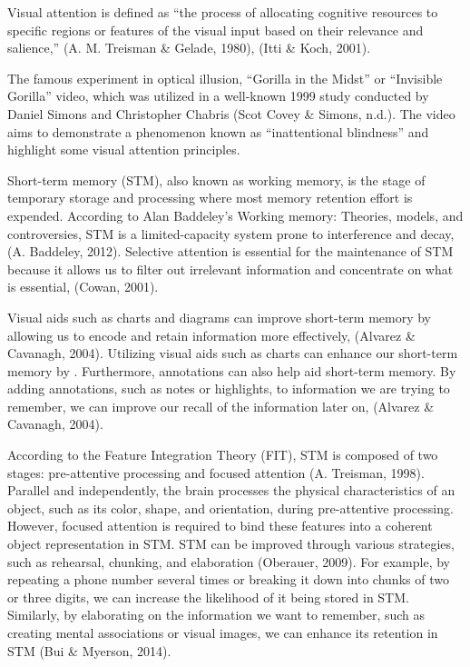 \documentclass[print]{nuthesis}
\begin{document}
Visual attention is defined as ``the process of allocating cognitive resources to specific regions or features of the visual input based on their relevance and salience,'' (A. M. Treisman \& Gelade, 1980), (Itti \& Koch, 2001).

The famous experiment in optical illusion, ``Gorilla in the Midst'' or ``Invisible Gorilla'' video, which was utilized in a well-known 1999 study conducted by Daniel Simons and Christopher Chabris (Scot Covey \& Simons, n.d.). The video aims to demonstrate a phenomenon known as ``inattentional blindness'' and highlight some visual attention principles.

Short-term memory (STM), also known as working memory, is the stage of temporary storage and processing where most memory retention effort is expended.
According to Alan Baddeley's Working memory: Theories, models, and controversies, STM is a limited-capacity system prone to interference and decay, (A. Baddeley, 2012).
Selective attention is essential for the maintenance of STM because it allows us to filter out irrelevant information and concentrate on what is essential, (Cowan, 2001).

Visual aids such as charts and diagrams can improve short-term memory by allowing us to encode and retain information more effectively, (Alvarez \& Cavanagh, 2004).
Utilizing visual aids such as charts can enhance our short-term memory by .
Furthermore, annotations can also help aid short-term memory.
By adding annotations, such as notes or highlights, to information we are trying to remember, we can improve our recall of the information later on, (Alvarez \& Cavanagh, 2004).

According to the Feature Integration Theory (FIT), STM is composed of two stages: pre-attentive processing and focused attention (A. Treisman, 1998).
Parallel and independently, the brain processes the physical characteristics of an object, such as its color, shape, and orientation, during pre-attentive processing.
However, focused attention is required to bind these features into a coherent object representation in STM.
STM can be improved through various strategies, such as rehearsal, chunking, and elaboration (Oberauer, 2009).
For example, by repeating a phone number several times or breaking it down into chunks of two or three digits, we can increase the likelihood of it being stored in STM.
Similarly, by elaborating on the information we want to remember, such as creating mental associations or visual images, we can enhance its retention in STM (Bui \& Myerson, 2014).
\end{document}
